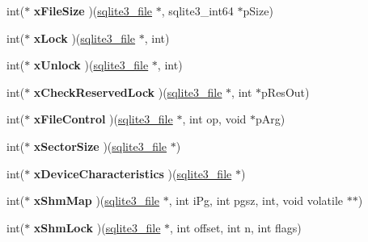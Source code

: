 \begin{DoxyCompactItemize}
int($\ast$ {\bfseries x\+File\+Size} )(\mbox{\hyperlink{structsqlite3__file}{sqlite3\+\_\+file}} $\ast$, sqlite3\+\_\+int64 $\ast$p\+Size)
\item 
\mbox{\label{structsqlite3__io__methods_ac88793475b0c4188fb02c229f1a11e8b}} 
int($\ast$ {\bfseries x\+Lock} )(\mbox{\hyperlink{structsqlite3__file}{sqlite3\+\_\+file}} $\ast$, int)
\item 
\mbox{\label{structsqlite3__io__methods_a5ce75a5ca2df9c1edcaef74d4c0d7e38}} 
int($\ast$ {\bfseries x\+Unlock} )(\mbox{\hyperlink{structsqlite3__file}{sqlite3\+\_\+file}} $\ast$, int)
\item 
\mbox{\label{structsqlite3__io__methods_a484752731e4a054c97497ad8d48a344b}} 
int($\ast$ {\bfseries x\+Check\+Reserved\+Lock} )(\mbox{\hyperlink{structsqlite3__file}{sqlite3\+\_\+file}} $\ast$, int $\ast$p\+Res\+Out)
\item 
\mbox{\label{structsqlite3__io__methods_a913b12deb1dcae2c61b90776bcd9d19c}} 
int($\ast$ {\bfseries x\+File\+Control} )(\mbox{\hyperlink{structsqlite3__file}{sqlite3\+\_\+file}} $\ast$, int op, void $\ast$p\+Arg)
\item 
\mbox{\label{structsqlite3__io__methods_a7a1c0cf3c4de6402a69f50e625be5ca2}} 
int($\ast$ {\bfseries x\+Sector\+Size} )(\mbox{\hyperlink{structsqlite3__file}{sqlite3\+\_\+file}} $\ast$)
\item 
\mbox{\label{structsqlite3__io__methods_abbf1b4769c310bfee517af815eed93e9}} 
int($\ast$ {\bfseries x\+Device\+Characteristics} )(\mbox{\hyperlink{structsqlite3__file}{sqlite3\+\_\+file}} $\ast$)
\item 
\mbox{\label{structsqlite3__io__methods_a2222efe012f210417f9881103014cdc5}} 
int($\ast$ {\bfseries x\+Shm\+Map} )(\mbox{\hyperlink{structsqlite3__file}{sqlite3\+\_\+file}} $\ast$, int i\+Pg, int pgsz, int, void volatile $\ast$$\ast$)
\item 
\mbox{\label{structsqlite3__io__methods_a2dbd4777e8ebce36b91dd5d64aef9bbf}} 
int($\ast$ {\bfseries x\+Shm\+Lock} )(\mbox{\hyperlink{structsqlite3__file}{sqlite3\+\_\+file}} $\ast$, int offset, int n, int flags)
$$
\end{DoxyCompactItemize}
